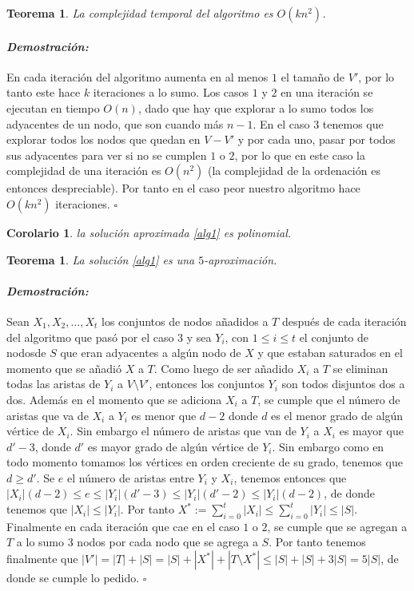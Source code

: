 \documentclass[10pt]{amsart}
\newtheorem{cor}[theorem]{Corolario}
\newtheorem{teo}[theorem]{Teorema}
\theoremstyle{definition}
\numberwithin{equation}{section}
\newenvironment{myproof} {\paragraph{\emph{Demostraci\'on:}}}{\hfill$\square$}
\begin{document}
	\begin{teo}
		La complejidad temporal del algoritmo es $O(kn^2)$.	
	\end{teo}

	\begin{myproof}
		En cada iteraci\'on del algoritmo aumenta en al menos $1$ el tama\~no de $V'$, por lo tanto este hace $k$ iteraciones a lo sumo. Los casos $1$ y $2$ en una iteraci\'on se ejecutan en tiempo $O(n)$, dado que hay que explorar a lo sumo todos los adyacentes de un nodo, que son cuando m\'as $n-1$. En el caso $3$ tenemos que explorar todos los nodos que quedan en $V - V'$ y por cada uno, pasar por todos sus adyacentes para ver si no se cumplen $1$ o $2$, por lo que en este caso la complejidad de una iteraci\'on es $O(n^2)$ (la complejidad de la ordenaci\'on es entonces despreciable). Por tanto en el caso peor nuestro algoritmo hace $O(kn^2)$ iteraciones.
	\end{myproof}
	
	\begin{cor}
		la soluci\'on aproximada \ref{alg1} es polinomial.
	\end{cor}
	
	\begin{teo}
		La soluci\'on \ref{alg1} es una $5$-aproximaci\'on.
	\end{teo}

	\begin{myproof}
		Sean $X_1, X_2, \dots, X_t$ los conjuntos de nodos a\~nadidos a $T$ despu\'es de cada iteraci\'on del algoritmo que pas\'o por el caso $3$ y sea $Y_i$, con $1 \le i \le t$ el conjunto de nodosde $S$ que eran adyacentes a alg\'un nodo de $X$ y que estaban saturados en el momento que se a\~nadi\'o $X$ a $T$. Como luego de ser a\~nadido $X_i$ a $T$ se eliminan todas las aristas de $Y_i$ a $V \setminus V'$, entonces los conjuntos $Y_i$ son todos disjuntos dos a dos. Adem\'as en el momento que se adiciona $X_i$ a $T$, se cumple que el n\'umero de aristas que va de $X_i$ a $Y_i$ es menor que $d - 2$ donde $d$ es  el menor grado de alg\'un v\'ertice de $X_i$. Sin embargo el n\'umero de aristas que van de $Y_i$ a $X_i$ es mayor que $d' - 3$, donde $d'$ es mayor grado de alg\'un v\'ertice de $Y_i$. Sin embargo como en todo momento tomamos los v\'ertices en orden creciente de su grado, tenemos que $d \ge d'$. Se $e$ el n\'umero de aristas entre $Y_i$ y $X_i$, tenemos entonces que  $|X_i|(d - 2) \le e \le  |Y_i|(d' - 3) \le |Y_i|(d' - 2) \le |Y_i| (d - 2)$, de donde tenemos que $|X_i| \le |Y_i|$. Por tanto $X^* := \sum_{i = 0}^t |X_i| \le \sum_{i = 0}^t |Y_i| \le |S|$. Finalmente en cada iteraci\'on que cae en el caso $1$ o $2$, se cumple que se agregan a $T$ a lo sumo $3$ nodos por cada nodo que se agrega a $S$. Por tanto tenemos finalmente que $|V'| = |T| + |S| = |S| + |X^*| + |T\setminus X^*|  \le |S| + |S| + 3|S| = 5 |S|$, de donde se cumple lo pedido. 
 	\end{myproof} 
	
\end{document}
